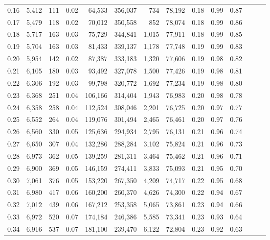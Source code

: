 \begin{tabular}{rrrrrrrrrrrrrr}
0.16 &  5,412 &    111 &  0.02 &   64,533 &  356,037 &     734 &  78,192 &  0.18 &  0.99 &      0.87 \\
0.17 &  5,479 &    118 &  0.02 &   70,012 &  350,558 &     852 &  78,074 &  0.18 &  0.99 &      0.86 \\
0.18 &  5,717 &    163 &  0.03 &   75,729 &  344,841 &   1,015 &  77,911 &  0.18 &  0.99 &      0.85 \\
0.19 &  5,704 &    163 &  0.03 &   81,433 &  339,137 &   1,178 &  77,748 &  0.19 &  0.99 &      0.83 \\
0.20 &  5,954 &    142 &  0.02 &   87,387 &  333,183 &   1,320 &  77,606 &  0.19 &  0.98 &      0.82 \\
0.21 &  6,105 &    180 &  0.03 &   93,492 &  327,078 &   1,500 &  77,426 &  0.19 &  0.98 &      0.81 \\
0.22 &  6,306 &    192 &  0.03 &   99,798 &  320,772 &   1,692 &  77,234 &  0.19 &  0.98 &      0.80 \\
0.23 &  6,368 &    251 &  0.04 &  106,166 &  314,404 &   1,943 &  76,983 &  0.20 &  0.98 &      0.78 \\
0.24 &  6,358 &    258 &  0.04 &  112,524 &  308,046 &   2,201 &  76,725 &  0.20 &  0.97 &      0.77 \\
0.25 &  6,552 &    264 &  0.04 &  119,076 &  301,494 &   2,465 &  76,461 &  0.20 &  0.97 &      0.76 \\
0.26 &  6,560 &    330 &  0.05 &  125,636 &  294,934 &   2,795 &  76,131 &  0.21 &  0.96 &      0.74 \\
0.27 &  6,650 &    307 &  0.04 &  132,286 &  288,284 &   3,102 &  75,824 &  0.21 &  0.96 &      0.73 \\
0.28 &  6,973 &    362 &  0.05 &  139,259 &  281,311 &   3,464 &  75,462 &  0.21 &  0.96 &      0.71 \\
0.29 &  6,900 &    369 &  0.05 &  146,159 &  274,411 &   3,833 &  75,093 &  0.21 &  0.95 &      0.70 \\
0.30 &  7,061 &    376 &  0.05 &  153,220 &  267,350 &   4,209 &  74,717 &  0.22 &  0.95 &      0.68 \\
0.31 &  6,980 &    417 &  0.06 &  160,200 &  260,370 &   4,626 &  74,300 &  0.22 &  0.94 &      0.67 \\
0.32 &  7,012 &    439 &  0.06 &  167,212 &  253,358 &   5,065 &  73,861 &  0.23 &  0.94 &      0.66 \\
0.33 &  6,972 &    520 &  0.07 &  174,184 &  246,386 &   5,585 &  73,341 &  0.23 &  0.93 &      0.64 \\
0.34 &  6,916 &    537 &  0.07 &  181,100 &  239,470 &   6,122 &  72,804 &  0.23 &  0.92 &      0.63 \\

\end{tabular}
